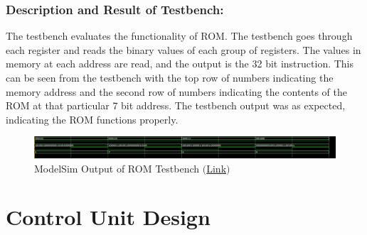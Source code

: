 \documentclass[10pt,letterpaper]{article}
\begin{document}
\subsubsection{Description and Result of Testbench:}
The testbench evaluates the functionality of ROM. The testbench goes through each register and reads the binary values of each group of registers. The values in memory at each address are read, and the output is the 32 bit instruction. This can be seen from the testbench with the top row of numbers indicating the memory address and the second row of numbers indicating the contents of the ROM at that particular 7 bit address. The testbench output was as expected, indicating the ROM functions properly.
\begin{figure}[H]
	\centering
	\includegraphics[width=\linewidth]{Figures/ROMTB}
	\caption{ModelSim Output of ROM Testbench \href{https://drive.google.com/file/d/1MDbTakSnFjR1TyeJRE6Qmvgbn0nLsLCv/view?usp=sharing}{$($Link$)$}}
	\label{fig:romtb}
\end{figure}
\newpage
\section{Control Unit Design}
\end{document}
